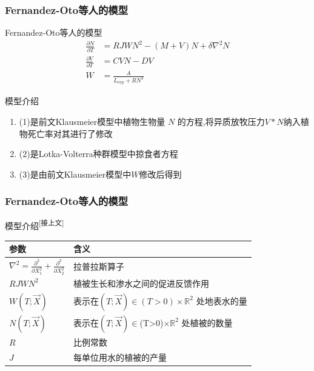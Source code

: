 \documentclass[aspectratio=169, 12pt, utf8, mathserif]{ctexbeamer} %
\begin{document}

\begin{frame}
	\frametitle{Fernandez-Oto等人的模型}
	\begin{exampleblock}{Fernandez-Oto等人的模型 \cite{[2]}}
		\begin{align}
			\frac{\partial N}{\partial T} &= RJWN^{2} - (M + V)N + \delta\nabla^{2}N \\
			\frac{\partial V}{\partial T} &= CVN - DV  \\
			W &= \frac{A}{L_{\mathrm{evp}} + RN^2} 
		\end{align}
	\end{exampleblock}
	
	\begin{exampleblock}{模型介绍}
		\begin{enumerate}
			\item \tiny (1)是前文Klausmeier模型中植物生物量 \(N\) 的方程,将异质放牧压力\(V*N\)纳入植物死亡率对其进行了修改
			\item \tiny (2)是Lotka-Volterra种群模型中掠食者方程
			\item \tiny (3)是由前文Klausmeier模型中\(W\)修改后得到
		\end{enumerate}
	\end{exampleblock}
\end{frame}


\begin{frame}
	\frametitle{Fernandez-Oto等人的模型}
	\begin{exampleblock}{模型介绍\textsuperscript{{\tiny [接上文]}}}
		\begin{center}
			\begin{tabular}{p{5cm}p{9cm}}
				\toprule
				参数 & 含义 \\
				\midrule
				$\nabla^2 = \frac{\partial^2}{\partial X_1^2} + \frac{\partial^2}{\partial X_2^2}$ & 拉普拉斯算子 \\
				$RJWN^2$ & 植被生长和渗水之间的促进反馈作用 \\
				$W(T;\vec{X})$ & 表示在$(T;\vec{X}) \in (T>0) \times \mathbb{R}^2$ 处地表水的量 \\
				$N(T;\vec{X})$ & 表示在$(T;\vec{X}) \in $(T>0)$\times \mathbb{R}^2$ 处植被的数量 \\
				$R$ & 比例常数 \\
				$J$ & 每单位用水的植被的产量 \\
				\bottomrule
			\end{tabular}
		\end{center}
	\end{exampleblock}
\end{frame}
\end{document}
